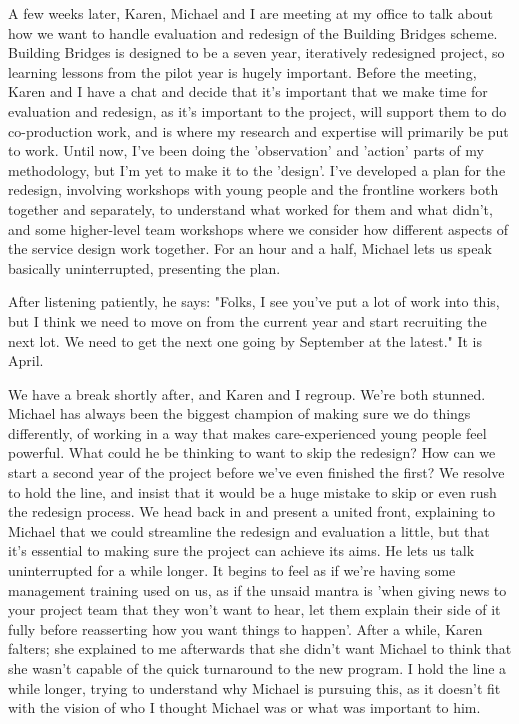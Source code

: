 A few weeks later, Karen, Michael and I are meeting at my office to talk about how we want to handle evaluation and redesign of the Building Bridges scheme. Building Bridges is designed to be a seven year, iteratively redesigned project, so learning lessons from the pilot year is hugely important. Before the meeting, Karen and I have a chat and decide that it's important that we make time for evaluation and redesign, as it's important to the project, will support them to do co-production work, and is where my research and expertise will primarily be put to work. Until now, I've been doing the 'observation' and 'action' parts of my methodology, but I'm yet to make it to the 'design'. I've developed a plan for the redesign, involving workshops with young people and the frontline workers both together and separately, to understand what worked for them and what didn't, and some higher-level team workshops where we consider how different aspects of the service design work together. For an hour and a half, Michael lets us speak basically uninterrupted, presenting the plan. 

After listening patiently,  he says: "Folks, I see you've put a lot of work into this, but I think we need to move on from the current year and start recruiting the next lot. We need to get the next one going by September at the latest." It is April.

We have a break shortly after, and Karen and I regroup. We're both stunned. Michael has always been the biggest champion of making sure we do things differently, of working in a way that makes care-experienced young people feel powerful. What could he be thinking to want to skip the redesign? How can we start a second year of the project before we've even finished the first? We resolve to hold the line, and insist that it would be a huge mistake to skip or even rush the redesign process. We head back in and present a united front, explaining to Michael that we could streamline the redesign and evaluation a little, but that it's essential to making sure the project can achieve its aims. He lets us talk uninterrupted for a while longer. It begins to feel as if we're having some management training used on us, as if the unsaid mantra is 'when giving news to your project team that they won't want to hear, let them explain their side of it fully before reasserting how you want things to happen'. After a while, Karen falters; she explained to me afterwards that she didn't want Michael to think that she wasn't capable of the quick turnaround to the new program. I hold the line a while longer, trying to understand why Michael is pursuing this, as it doesn't fit with the vision of who I thought Michael was or what was important to him.

